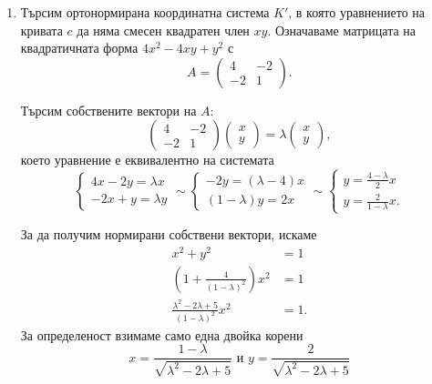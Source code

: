 \documentclass[numbers=endperiod, DIV=15, bibliography=totocnumbered]{scrartcl}
\begin{document}
\begin{solution}
  \begin{enumerate}
    \item Търсим ортонормирана координатна система $K'$, в която уравнението на кривата $c$ да няма смесен квадратен член $xy$. Означаваме матрицата на квадратичната форма $4x^2 - 4xy + y^2$ с
    \begin{displaymath}
      A = \begin{pmatrix}
        4 & -2 \\
        -2 & 1
      \end{pmatrix}.
    \end{displaymath}

    Търсим собствените вектори на $A$:
    \begin{displaymath}
      \begin{pmatrix}
        4 & -2 \\
        -2 & 1
      \end{pmatrix}
      \begin{pmatrix}
        x \\ y
      \end{pmatrix}
      =
      \lambda
      \begin{pmatrix}
        x \\ y
      \end{pmatrix},
    \end{displaymath}
    което уравнение е еквивалентно на системата
    \begin{equation}
      \label{ex:canon:eigen}
      \begin{cases}
        4x - 2y = \lambda x \\
        -2x + y = \lambda y
      \end{cases}
      \sim
      \begin{cases}
        -2y = (\lambda - 4) x \\
        (1 - \lambda) y = 2x
      \end{cases}
      \sim
      \begin{cases}
        y = \frac {4 - \lambda} 2 x \\
        y = \frac 2 {1 - \lambda} x.
      \end{cases}
    \end{equation}

    За да получим нормирани собствени вектори, искаме
    \begin{align*}
      x^2 + y^2 &= 1 \\
      \left(1 +  \frac 4 {{(1 - \lambda)}^2} \right) x^2 &= 1 \\
      \frac {\lambda^2 - 2\lambda + 5} {{(1 - \lambda)}^2} x^2 &= 1.
    \end{align*}
    За определеност взимаме само една двойка корени
    \begin{equation}
      \label{ex:canon:normed_eigen}
      x = \frac {1 - \lambda} {\sqrt{\lambda^2 - 2\lambda + 5}}
      \text{ и }
      y = \frac 2 {\sqrt{\lambda^2 - 2\lambda + 5}}
    \end{equation}


\end{enumerate}
\end{solution}
\end{document}
